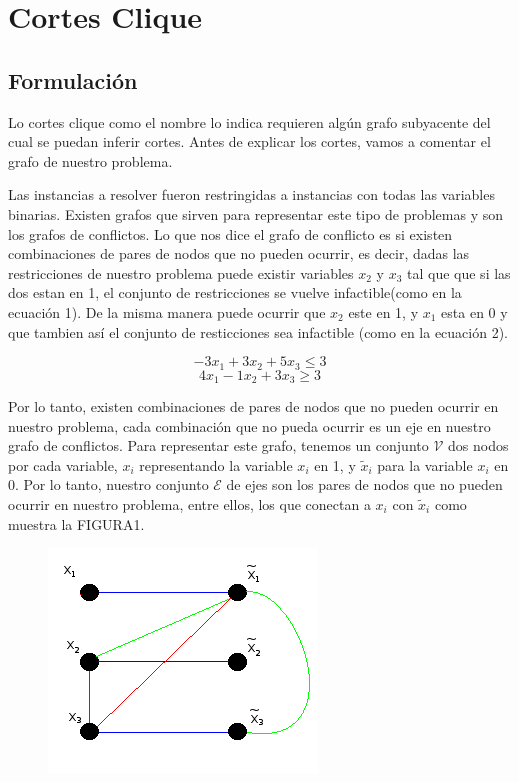 \section{Cortes Clique}

\bigskip
\subsection{Formulaci\'on}

Lo cortes clique como el nombre lo indica requieren alg\'un grafo subyacente del cual se puedan inferir cortes.
Antes de explicar los cortes, vamos a comentar el grafo de nuestro problema.

Las instancias a resolver fueron restringidas a instancias con todas las variables binarias.
Existen grafos que sirven para representar este tipo de problemas y son los grafos de conflictos.
Lo que nos dice el grafo de conflicto es si existen combinaciones de pares de nodos que no pueden ocurrir, es decir,
dadas las restricciones de nuestro problema puede existir variables $x_2$ y $x_3$ tal que que si las dos estan en 1,
el conjunto de restricciones se vuelve infactible(como en la ecuaci\'on 1). De la misma manera puede ocurrir que $x_2$ este en 1, y $x_1$ esta en 0 y que tambien
as\'i el conjunto de resticciones sea infactible (como en la ecuaci\'on 2).

\begin{equation}
-3 x_1 + 3 x_2 + 5 x_3 \leq 3
\end{equation}
\begin{equation}
4 x_1 - 1 x_2 + 3 x_3 \geq 3
\end{equation}

Por lo tanto, existen combinaciones de pares de nodos que no pueden ocurrir en nuestro problema, cada combinaci\'on que no pueda ocurrir
es un eje en nuestro grafo de conflictos. Para representar este grafo, tenemos un conjunto $\mathcal{V}$ dos nodos por cada variable, $x_i$
representando la variable $x_i$ en 1, y $\tilde{x}_i$ para la variable $x_i$ en 0. Por lo tanto, nuestro conjunto $\mathcal{E}$ de ejes son los pares de 
nodos que no pueden ocurrir en nuestro problema, entre ellos, los que conectan a $x_i$ con $\tilde{x}_i$ como muestra la FIGURA1.


\begin{figure}[H]
\begin{center}
\includegraphics{grafoconflicto}
\end{center}
\label{Grafo de conflictos del las restricciones REF}
\end{figure}

